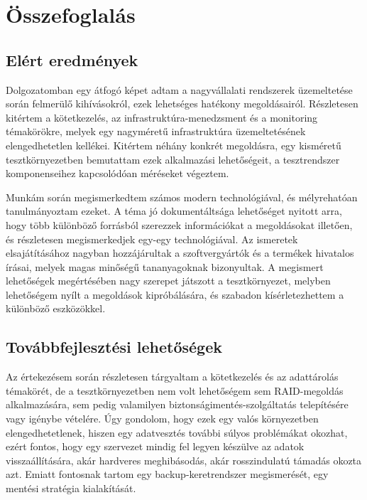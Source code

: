 
\chapter{Összefoglalás}

\section{Elért eredmények}
Dolgozatomban egy átfogó képet adtam a nagyvállalati rendszerek üzemeltetése során felmerülő kihívásokról, ezek lehetséges hatékony megoldásairól. Részletesen kitértem a kötetkezelés, az infrastruktúra-menedzsment és a monitoring témakörökre, melyek egy nagyméretű infrastruktúra üzemeltetésének elengedhetetlen kellékei. Kitértem néhány konkrét megoldásra, egy kisméretű tesztkörnyezetben bemutattam ezek alkalmazási lehetőségeit, a tesztrendszer komponenseihez kapcsolódóan méréseket végeztem.

Munkám során megismerkedtem számos modern technológiával, és mélyrehatóan tanulmányoztam ezeket. A téma jó dokumentáltsága lehetőséget nyitott arra, hogy több különböző forrásból szerezzek információkat a megoldásokat illetően, és részletesen megismerkedjek egy-egy technológiával. Az ismeretek elsajátításához nagyban hozzájárultak a szoftvergyártók és a termékek hivatalos írásai, melyek magas minőségű tananyagoknak bizonyultak. A megismert lehetőségek megértésében nagy szerepet játszott a tesztkörnyezet, melyben lehetőségem nyílt a megoldások kipróbálására, és szabadon kísérletezhettem a különböző eszközökkel.

\section{Továbbfejlesztési lehetőségek}
Az értekezésem során részletesen tárgyaltam a kötetkezelés és az adattárolás témakörét, de a tesztkörnyezetben nem volt lehetőségem sem RAID-megoldás alkalmazására, sem pedig valamilyen biztonságimentés-szolgáltatás telepítésére vagy igénybe vételére. Úgy gondolom, hogy ezek egy valós környezetben elengedhetetlenek, hiszen egy adatvesztés további súlyos problémákat okozhat, ezért fontos, hogy egy szervezet mindig fel legyen készülve az adatok visszaállítására, akár hardveres meghibásodás, akár rosszindulatú támadás okozta azt. Emiatt fontosnak tartom egy backup-keretrendszer megismerését, egy mentési stratégia kialakítását.

